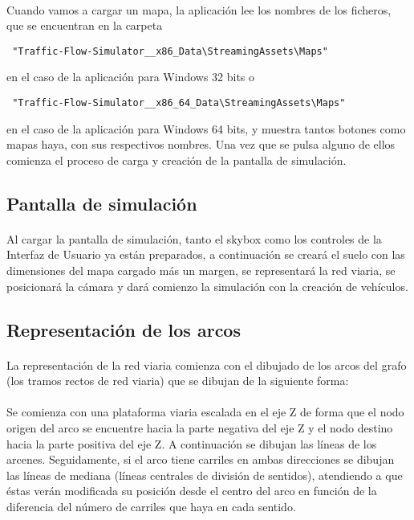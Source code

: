 	\paragraph{}	
	Cuando vamos a cargar un mapa, la aplicación lee los nombres de los ficheros, que se encuentran en la carpeta
	\begin{verbatim} "Traffic-Flow-Simulator__x86_Data\StreamingAssets\Maps" \end{verbatim} en el caso de la aplicación para Windows 32 bits o 				\begin{verbatim} "Traffic-Flow-Simulator__x86_64_Data\StreamingAssets\Maps" \end{verbatim} en el caso de la aplicación para Windows 64 bits, y muestra tantos botones como mapas haya, con sus respectivos nombres. Una vez que se pulsa alguno de ellos comienza el proceso de carga y creación de la pantalla de simulación.
	
	\subsection{Pantalla de simulación}
	\paragraph{}
	Al cargar la pantalla de simulación, tanto el skybox como los controles de la Interfaz de Usuario ya están preparados, a continuación se creará el suelo con las dimensiones del mapa cargado más un margen, se representará la red viaria, se posicionará la cámara y dará comienzo la simulación con la creación de vehículos.
	
	\subsection{Representación de los arcos}
	\paragraph{}
	La representación de la red viaria comienza con el dibujado de los arcos del grafo (los tramos rectos de red viaria) que se dibujan de la siguiente forma:
	
	\paragraph{}
	Se comienza con una plataforma viaria escalada en el eje Z de forma que el nodo origen del arco se encuentre hacia la parte negativa del eje Z y el nodo destino hacia la parte positiva del eje Z. A continuación se dibujan las líneas de los arcenes. Seguidamente, si el arco tiene carriles en ambas direcciones se dibujan las líneas de mediana (líneas centrales de división de sentidos), atendiendo a que éstas verán modificada su posición desde el centro del arco en función de la diferencia del número de carriles que haya en cada sentido.
